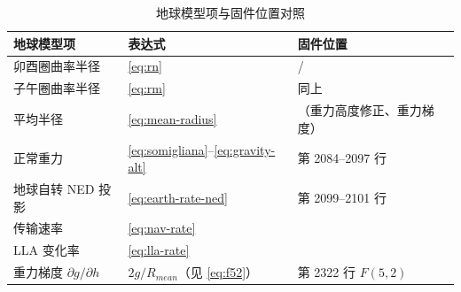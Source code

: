\begin{table}[H]
\centering
\caption{地球模型项与固件位置对照}
\label{tab:earth-terms}
\small
\begin{tabularx}{\textwidth}{@{}L{4.6cm}L{5.4cm}X@{}}
\toprule
\textbf{地球模型项} & \textbf{表达式} & \textbf{固件位置} \\
\midrule
卯酉圈曲率半径 & \cref{eq:rn} &  /  \\
子午圈曲率半径 & \cref{eq:rm} & 同上 \\
平均半径 & \cref{eq:mean-radius} & （重力高度修正、重力梯度）\\
正常重力 & \cref{eq:somigliana}--\cref{eq:gravity-alt} & 第 2084--2097 行 \\
地球自转 NED 投影 & \cref{eq:earth-rate-ned} & 第 2099--2101 行 \\
传输速率 & \cref{eq:nav-rate} &  \\
LLA 变化率 & \cref{eq:lla-rate} &  \\
重力梯度 $\partial g/\partial h$ & $2g/R_{mean}$（见 \cref{eq:f52}）& 第 2322 行 $F(5,2)$ \\
\bottomrule
\end{tabularx}
\end{table}
